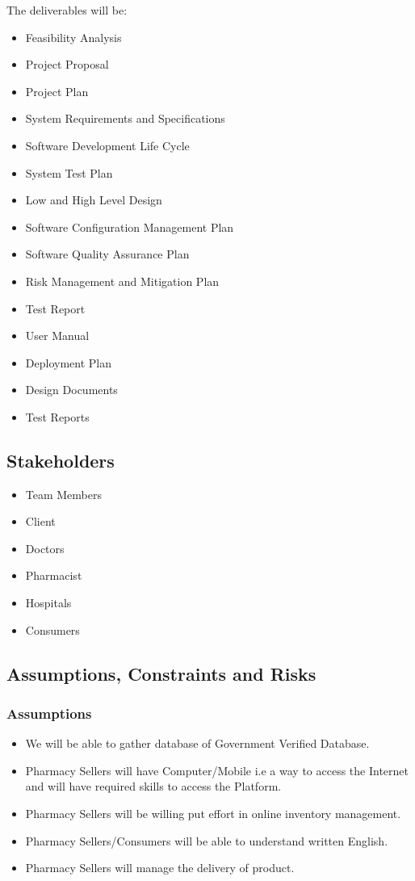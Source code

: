 \documentclass[
10pt, %
a4paper, %
oneside, %
headinclude,footinclude, %
BCOR5mm, %
]{scrartcl}
\begin{document}
The deliverables will be:
\begin{itemize}

\item 	Feasibility Analysis
\item 	Project Proposal 
\item 	Project Plan
\item 	System Requirements and Specifications
\item 	Software Development Life Cycle
\item 	System Test Plan
\item 	Low and High Level Design
\item 	Software Configuration Management Plan
\item 	Software Quality Assurance Plan
\item 	Risk Management and Mitigation Plan
\item 	Test Report
\item 	User Manual
\item 	Deployment Plan
\item 	Design Documents
\item 	Test Reports

\end{itemize}
 
 
\subsection{Stakeholders}
\begin{itemize}
    
\item Team Members
\item Client
\item Doctors
\item Pharmacist
\item Hospitals
\item Consumers

\end{itemize}


\subsection{Assumptions, Constraints and Risks}

\subsubsection{Assumptions}
\begin{itemize}
\item We will be able to gather database of Government Verified Database.
\item Pharmacy Sellers will have Computer/Mobile i.e a way to access the Internet and will have required skills to access the Platform.
\item Pharmacy Sellers will be willing put effort in online inventory management.
\item Pharmacy Sellers/Consumers will be able to understand written English.
\item Pharmacy Sellers will manage the delivery of product.
\end{itemize}
\end{document}
